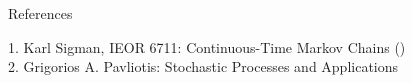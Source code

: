\documentclass{beamer}%
\theoremstyle{definition}
\begin{document}
\begin{frame}{References}

1. Karl Sigman, IEOR 6711: Continuous-Time Markov Chains (\href{http://www.columbia.edu/~ks20/stochastic-I/stochastic-I-CTMC.pdf}{})
\\
$\:$
\\
2. Grigorios A. Pavliotis: Stochastic Processes and Applications


\end{frame}
\end{document}
